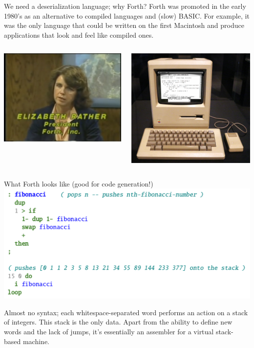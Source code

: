 \documentclass[aspectratio=169]{beamer}
\begin{document}
\begin{frame}{We need a deserialization language; why Forth?}
\vspace{0.5 cm}
Forth was promoted in the early 1980's as an alternative to compiled languages and (slow) BASIC. For example, it was the only language that could be written on the first Macintosh and produce applications that look and feel like compiled ones.

\vspace{0.5 cm}
\begin{columns}
\centering
\includegraphics[height=5 cm]{PLOTS/elizabeth-rather-the-computer-chronicles.png}

\centering
\includegraphics[height=5 cm]{PLOTS/macintosh-forth-code.jpg}
\end{columns}
\end{frame}

\begin{frame}{What Forth looks like (good for code generation!)}
\vspace{0.5 cm}
\includegraphics[width=0.9\linewidth]{PLOTS/forth-example.png}

\vspace{0.15 cm}
Almost no syntax; each whitespace-separated word performs an action on a stack of integers. This stack is the only data. Apart from the ability to define new words and the lack of jumps, it's essentially an assembler for a virtual stack-based machine.
\end{frame}
\end{document}
